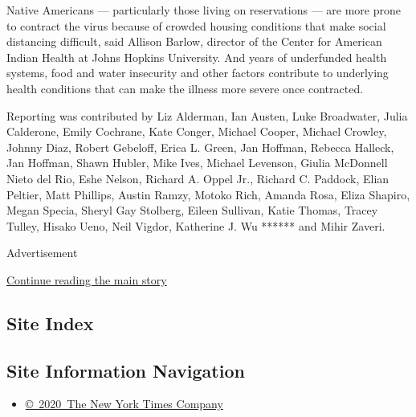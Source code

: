 Native Americans --- particularly those living on reservations --- are
more prone to contract the virus because of crowded housing conditions
that make social distancing difficult, said Allison Barlow, director of
the Center for American Indian Health at Johns Hopkins University. And
years of underfunded health systems, food and water insecurity and other
factors contribute to underlying health conditions that can make the
illness more severe once contracted.

Reporting was contributed by Liz Alderman, Ian Austen, Luke Broadwater,
Julia Calderone, Emily Cochrane, Kate Conger, Michael Cooper, Michael
Crowley, Johnny Diaz, Robert Gebeloff, Erica L. Green, Jan Hoffman,
Rebecca Halleck, Jan Hoffman, Shawn Hubler, Mike Ives, Michael Levenson,
Giulia McDonnell Nieto del Rio, Eshe Nelson, Richard A. Oppel Jr.,
Richard C. Paddock, Elian Peltier, Matt Phillips, Austin Ramzy, Motoko
Rich, Amanda Rosa, Eliza Shapiro, Megan Specia, Sheryl Gay Stolberg,
Eileen Sullivan, Katie Thomas, Tracey Tulley, Hisako Ueno, Neil Vigdor,
Katherine J. Wu ****** and Mihir Zaveri.

Advertisement

\protect\hyperlink{after-bottom}{Continue reading the main story}

\hypertarget{site-index}{%
\subsection{Site Index}\label{site-index}}

\hypertarget{site-information-navigation}{%
\subsection{Site Information
Navigation}\label{site-information-navigation}}

\begin{itemize}
\tightlist
\item
  \href{https://help.nytimes.com/hc/en-us/articles/115014792127-Copyright-notice}{©~2020~The
  New York Times Company}
\end{itemize}

